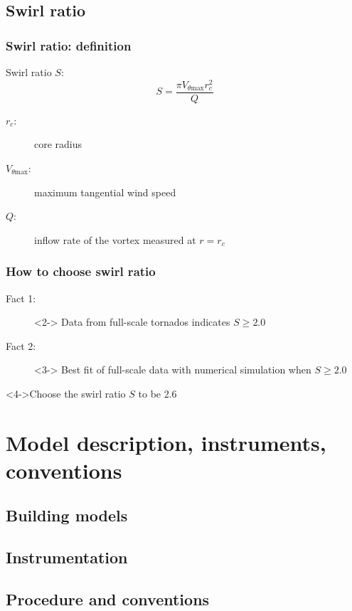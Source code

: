 \documentclass{beamer}
\begin{document}
\subsection{Swirl ratio}

\begin{frame}
	\frametitle{Swirl ratio: definition}
	\begin{definition}
		\alert{Swirl ratio $S$}: 
		$$ S = \frac{\pi V_{\theta\mathrm{max}} r_c^2}{Q}$$
		\begin{description}
			\item[$r_c$: ] core radius
			\item[$V_{\theta\mathrm{max}}$: ] maximum tangential wind speed
			\item[$Q$: ] inflow rate of the vortex measured at $r=r_c$
		\end{description}
	\end{definition}
\end{frame}

\begin{frame}
	\frametitle{How to choose swirl ratio}
		\begin{description}
			\item[Fact 1: ] <2-> Data from full-scale tornados indicates \alert{$S\geqslant2.0$}
			\item[Fact 2: ]<3-> Best fit of full-scale data with numerical simulation when \alert{$S\geqslant2.0$}
		\end{description}
		\begin{block}<4->{Choose the swirl ratio $S$  to be \alert{\num{2.6}} }
			
		\end{block}
\end{frame}


\section{Model description, instruments,  conventions}
\subsection{Building models}
\subsection{Instrumentation}
\subsection{Procedure and conventions}
\end{document}
